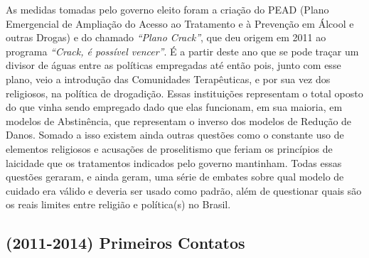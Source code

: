\documentclass[
	12pt,				%
	oneside,			%
	a4paper,			%
	sumario=tradicional,
	english,			%
	brazil				%
	]{abntex2}
\begin{document}
As medidas tomadas pelo governo eleito foram a criação do \acrshort{PEAD} (Plano Emergencial de Ampliação do Acesso ao Tratamento e à Prevenção em Álcool e outras Drogas) e do chamado \emph{``Plano Crack''}, que deu origem em 2011 ao programa \emph{``Crack, é possível vencer''}. É a partir deste ano que se pode traçar um divisor de águas entre as políticas empregadas até então pois, junto com esse plano, veio a introdução das Comunidades Terapêuticas, e por sua vez dos religiosos, na política de drogadição. Essas instituições representam o total oposto do que vinha sendo empregado dado que elas funcionam, em sua maioria, em modelos de Abstinência, que representam o inverso dos modelos de Redução de Danos. Somado a isso existem ainda outras questões como o constante uso de elementos religiosos e acusações de proselitismo que feriam os princípios de laicidade que os tratamentos indicados pelo governo mantinham. Todas essas questões geraram, e ainda geram, uma série de embates sobre qual modelo de cuidado era válido e deveria ser usado como padrão, além de questionar quais são os reais limites entre religião e política(s) no Brasil.

\hypertarget{primeiros-contatos}{%
\subsection{(2011-2014) Primeiros Contatos}\label{primeiros-contatos}}
\end{document}
